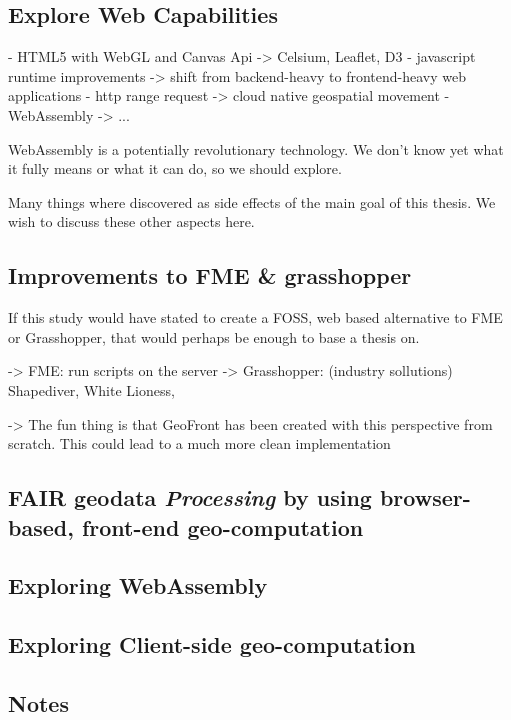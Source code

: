 \subsection*{Explore Web Capabilities }

- HTML5 with WebGL and Canvas Api -> Celsium, Leaflet, D3
- javascript runtime improvements -> shift from backend-heavy to frontend-heavy web applications
- http range request -> cloud native geospatial movement 
- WebAssembly -> ...

WebAssembly is a potentially revolutionary technology. We don't know yet what it fully means or what it can do, so we should explore.


Many things where discovered as side effects of the main goal of this thesis. We wish to discuss these other aspects here.

\subsection{Improvements to FME \& grasshopper}
If this study would have stated to create a FOSS, web based alternative to FME or Grasshopper, that would perhaps be enough to base a thesis on.

-> FME: run scripts on the server 
-> Grasshopper: (industry sollutions) Shapediver, White Lioness, 

-> The fun thing is that GeoFront has been created with this perspective from scratch. This could lead to a much more clean implementation

\subsection{FAIR geodata \emph{Processing} by using browser-based, front-end geo-computation}



\subsection{Exploring WebAssembly}

\subsection{Exploring Client-side geo-computation}


\subsection{Notes}


